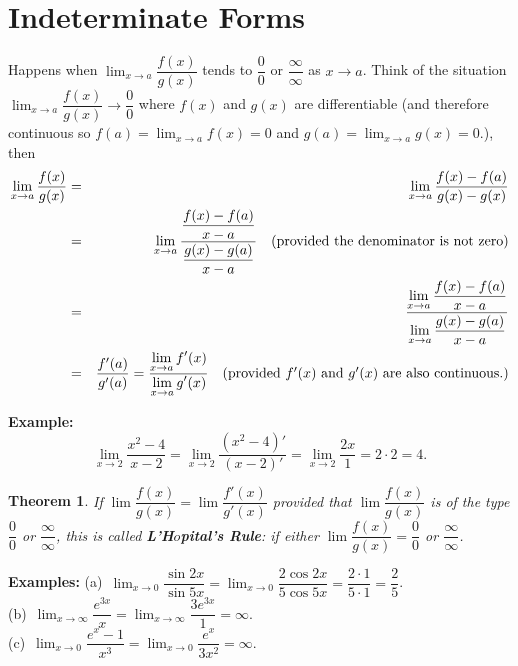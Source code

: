 \documentclass[titlepage,a4paper,12pt]{report}
\newtheorem{theorem}{Theorem}[section]
\begin{document}
\section{Indeterminate Forms}
Happens when $\displaystyle \lim _{x\rightarrow a} \dfrac{f(x)}{g(x)}$ tends to  $\dfrac{0}{0}$ or $\dfrac{\infty}{\infty}$ as $x\rightarrow a$. Think of the situation $\displaystyle \lim _{x\rightarrow a} \dfrac{f(x)}{g(x)}\rightarrow \dfrac{0}{0}$ where $f(x)$ and $g(x)$ are differentiable  (and therefore continuous  so $f(a)=\displaystyle \lim _{x\rightarrow a} f(x)=0$ and $g(a)=\displaystyle \lim _{x\rightarrow a}g(x)=0$.), then 
\begin{eqnarray*}
\lim _{x\rightarrow a} \dfrac{f(x)}{g(x)} &=& \lim _{x\rightarrow a} \dfrac{f(x)-f(a)}{g(x)-g(x)}\\
&=& \lim _{x\rightarrow a} \dfrac{\dfrac{f(x)-f(a)}{x-a}}{\dfrac{g(x)-g(a)}{x-a}} \quad \hbox{(provided the denominator is not zero)}\\
&=& \dfrac{\displaystyle \lim _{x\rightarrow a}\dfrac{f(x)-f(a)}{x-a}}{\displaystyle \lim _{x\rightarrow a}\dfrac{g(x)-g(a)}{x-a}}\\
&=& \dfrac{f'(a)}{g'(a)} =\dfrac{\displaystyle \lim _{x\rightarrow a} f'(x)}{\displaystyle \lim _{x\rightarrow a} g'(x)} \quad \hbox{(provided $f'(x)$ and $g'(x)$ are also continuous.)}
\end{eqnarray*}

\noindent \textbf{Example:} 
\begin{equation*}
\lim _{x\rightarrow 2} \dfrac{x^2-4}{x-2} =\lim _{x\rightarrow 2} \dfrac{(x^2-4)'}{(x-2)'}=\lim _{x\rightarrow 2} \dfrac{2x}{1}=2\cdot 2 =4.
\end{equation*}

\begin{theorem}
If $\displaystyle \lim  \dfrac{f(x)}{g(x)}=\lim \dfrac{f'(x)}{g'(x)}$ provided that $\displaystyle \lim \dfrac{f(x)}{g(x)}$ is of the type $\dfrac{0}{0}$ or $\dfrac{\infty}{\infty}$, this is called \textbf{L'H$\hat{o}$pital's Rule}: if either $\displaystyle \lim \dfrac{f(x) }{g(x)}=\dfrac{0}{0}$ or $\dfrac{\infty}{\infty}$.
\end{theorem}

\noindent \textbf{Examples:} (a)\, $\displaystyle \lim _{x\rightarrow 0}\dfrac{\sin 2x}{\sin 5x}=\lim _{x\rightarrow 0}\dfrac{2\cos 2x}{5\cos 5x}=\dfrac{2\cdot 1}{5\cdot 1}=\dfrac{2}{5}$. \\
(b)\, $\displaystyle \lim _{x\rightarrow \infty} \dfrac{e^{3x}}{x}=\lim _{x\rightarrow \infty} \dfrac{3e^{3x}}{1}=\infty$.\\
(c)\, $\displaystyle \lim _{x\rightarrow 0} \dfrac{e^x-1}{x^3}=\lim _{x \rightarrow 0} \dfrac{e^x}{3x^2}=\infty$.
\end{document}
